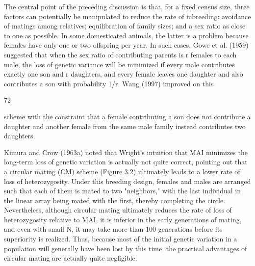 \documentclass{article}
\begin{document}
The central point of the preceding discussion is that, for a fixed census size, three factors can potentially be manipulated to reduce the rate of inbreeding: avoidance of matings among relatives; equilibration of family sizes; and a sex ratio as close to one as possible. In some domesticated animals, the latter is a problem because females have only one or two offspring per year. In such cases, Gowe et al. (1959) suggested that when the sex ratio of contributing parents is r females to each male, the loss of genetic variance will be minimized if every male contributes exactly one son and r daughters, and every female leaves one daughter and also contributes a son with probability 1/r. Wang (1997) improved on this

72

scheme with the constraint that a female contributing a son does not contribute a daughter and another female from the same male family instead contributes two daughters.

Kimura and Crow (1963a) noted that Wright's intuition that MAI minimizes the long-term loss of genetic variation is actually not quite correct, pointing out that a circular mating (CM) scheme (Figure 3.2) ultimately leads to a lower rate of loss of heterozygosity. Under this breeding design, females and males are arranged such that each of them is mated to two "neighbors," with the last individual in the linear array being mated with the first, thereby completing the circle. Nevertheless, although circular mating ultimately reduces the rate of loss of heterozygosity relative to MAI, it is inferior in the early generations of mating, and even with small N, it may take more than 100 generations before its superiority is realized. Thus, because most of the initial genetic variation in a population will generally have been lost by this time, the practical advantages of circular mating are actually quite negligible.
\end{document}
